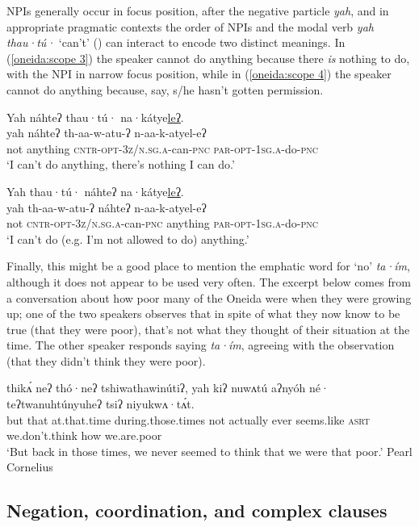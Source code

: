 \documentclass[output=paper,colorlinks,citecolor=brown]{langscibook}
\begin{document}
NPIs generally occur in focus position, after the negative particle \textit{yah}, and in appropriate pragmatic contexts the order of NPIs and the modal verb \textit{yah thau·tú·} `can't' () can interact to encode two distinct meanings. In (\ref{oneida:scope 3}) the speaker cannot do anything because there \textit{is} nothing to do, with the NPI in narrow focus position, while in (\ref{oneida:scope 4}) the speaker cannot do anything because, say, s/he hasn't gotten permission.

\ea\label{oneida:scope 3}
    \glll Yah náhteʔ thau·tú· na·kátye\uline{leʔ}. \\
    yah náhteʔ th-aa-w-atu-ʔ n-aa-k-atyel-eʔ \\
    not anything \textsc{cntr-opt-3z/n.sg.a}-can-\textsc{pnc} \textsc{par-opt-1sg.a}-do-\textsc{pnc} \\
    \glt `I can't do anything, there's nothing I can do.' 
\z

\ea\label{oneida:scope 4}
    \glll Yah thau·tú· náhteʔ na·kátye\uline{leʔ}. \\
    yah th-aa-w-atu-ʔ náhteʔ n-aa-k-atyel-eʔ \\
    not \textsc{cntr-opt-3z/n.sg.a}-can-\textsc{pnc} anything \textsc{par-opt-1sg.a}-do-\textsc{pnc} \\
    \glt `I can't do (e.g. I'm not allowed to do) anything.' 
\z

Finally, this might be a good place to mention the emphatic word for `no' \textit{ta·ím}, although it does not appear to be used very often. The excerpt below comes from a conversation about how poor many of the Oneida were when they were growing up; one of the two speakers observes that in spite of what they now know to be true (that they were poor), that's not what they thought of their situation at the time. The other speaker responds saying \textit{ta·ím}, agreeing with the observation (that they didn't think they were poor).

\ea\label{oneida:taim}
	 thikʌ́  {neʔ thó·neʔ} tshiwathawinútiʔ, yah kiʔ nuwʌtú aʔnyóh né· teʔtwanuhtúnyuheʔ tsiʔ niyukwʌ·tʌ́t. \\
	but that {at.that.time} {during.those.times} not actually ever {seems.like} \textsc{asrt} {we.don't.think} how {we.are.poor} \\
	\glt `But back in those times, we never seemed to think that we were that poor.' Pearl Cornelius \citep[304 (63)]{MichelsonEtAl2016}
\z

\subsection{Negation, coordination, and complex clauses}
\label{oneida:sec:except}
\end{document}
